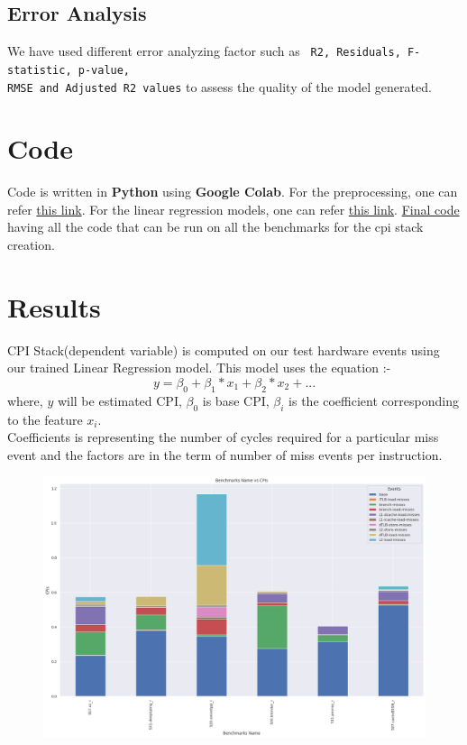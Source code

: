 \documentclass[10pt, letterpaper, IEEEtran, tikz,border=5,a4paper,fleqn]{article}
\begin{document}
\subsection{Error Analysis}

We have used different error analyzing factor such as \verb| R2, Residuals, F-statistic, p-value,|\\ \verb|RMSE and Adjusted R2 values| to assess the quality of the model generated.

\section{Code}

Code is written in \textbf{Python} using \textbf{Google Colab}. For the preprocessing, one can refer \href{https://colab.research.google.com/drive/1VmkJbYE7EdJ5HFUyMy4FOpxf_3iagbxn?usp=sharing}{\color{blue} this link}. For the linear regression models, one can refer \href{https://colab.research.google.com/drive/1qcsSkg_DKaM5B8WkhQnJwOg_wozr9eaJ?usp=sharing}{\color{blue} this link}. \href{https://colab.research.google.com/drive/1AYyh_fw5Jp6La6UNAu6Yj63GjWdVIcUc?usp=sharing}{Final code} having all the code that can be run on all the benchmarks for the cpi stack creation.

\section{Results}

CPI Stack(dependent variable) is computed on our test hardware events using our trained Linear Regression model. This model uses the equation :- \[y = \beta_0 + \beta_1*x_1 + \beta_2*x_2 + ...\]
where, $y$ will be estimated CPI, $\beta_0$ is base CPI, $\beta_i$ is the coefficient corresponding to the feature $x_i$.\\
Coefficients is representing the number of cycles required for a particular miss event and the factors are in the term of number of miss events per instruction.

\begin{figure}[h]
 \begin{center}
      \includegraphics[scale=.37]{cpi_stack.png}
 \end{center}
 \label{fig:cpi_stack}
\end{figure}
\end{document}
